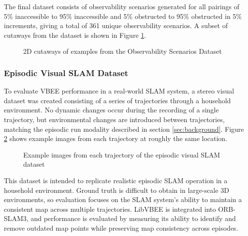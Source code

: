\begin{singlespace}
    \begin{algorithm}[H]
        \caption[Generate Observability Scenario]{$\operatorname{GenerateObservabilityScenario}$}
        \label{alg:generate_observability_scenario}
        \begin{algorithmic}
            \EndFunction
        \end{algorithmic}
    \end{algorithm}
\end{singlespace}

The final dataset consists of observability scenarios generated for all pairings of 5\% inaccessible to 95\% inaccessible and 5\% obstructed to 95\% obstructed in 5\% increments, giving a total of 361 unique observability scenarios. A subset of cutaways from the dataset is shown in Figure \ref{fig:observability_scenarios}.

\begin{figure}[H]
    \centering
    \caption{2D cutaways of examples from the Observability Scenarios Dataset}
    \label{fig:observability_scenarios}
\end{figure}

\subsubsection{Episodic Visual SLAM Dataset}
To evaluate VBEE performance in a real-world SLAM system, a stereo visual dataset was created consisting of a series of trajectories through a household environment. No dynamic changes occur during the recording of a single trajectory, but environmental changes are introduced between trajectories, matching the episodic run modality described in section \ref{sec:background}. Figure \ref{fig:episodic_datasets} shows example images from each trajectory at roughly the same location.

\begin{figure}[H]
    \centering
    \caption{Example images from each trajectory of the episodic visual SLAM dataset}
    \label{fig:episodic_datasets}
\end{figure}

This dataset is intended to replicate realistic episodic SLAM operation in a household environment. Ground truth is difficult to obtain in large-scale 3D environments, so evaluation focuses on the SLAM system's ability to maintain a consistent map across multiple trajectories. LibVBEE is integrated into ORB-SLAM3, and performance is evaluated by measuring its ability to identify and remove outdated map points while preserving map consistency across episodes.
